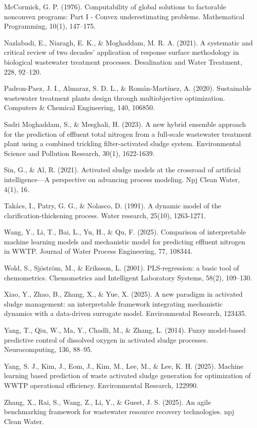\documentclass{article}
\begin{document}
McCormick, G. P. (1976). Computability of global solutions to factorable nonconvex programs: Part I - Convex underestimating problems. Mathematical Programming, 10(1), 147–175.

Nazlabadi, E., Niaragh, E. K., \& Moghaddam, M. R. A. (2021). A systematic and critical review of two decades’ application of response surface methodology in biological wastewater treatment processes. Desalination and Water Treatment, 228, 92–120.

Padron-Paez, J. I., Almaraz, S. D. L., \& Román-Martínez, A. (2020). Sustainable wastewater treatment plants design through multiobjective optimization. Computers \& Chemical Engineering, 140, 106850.

Sadri Moghaddam, S., \& Mesghali, H. (2023). A new hybrid ensemble approach for the prediction of effluent total nitrogen from a full-scale wastewater treatment plant using a combined trickling filter-activated sludge system. Environmental Science and Pollution Research, 30(1), 1622-1639.

Sin, G., \& Al, R. (2021). Activated sludge models at the crossroad of artificial intelligence—A perspective on advancing process modeling. Npj Clean Water, 4(1), 16.

Takács, I., Patry, G. G., \& Nolasco, D. (1991). A dynamic model of the clarification-thickening process. Water research, 25(10), 1263-1271.

Wang, Y., Li, T., Bai, L., Yu, H., \& Qu, F. (2025). Comparison of interpretable machine learning models and mechanistic model for predicting effluent nitrogen in WWTP. Journal of Water Process Engineering, 77, 108344.

Wold, S., Sjöström, M., \& Eriksson, L. (2001). PLS-regression: a basic tool of chemometrics. Chemometrics and Intelligent Laboratory Systems, 58(2), 109–130.

Xiao, Y., Zhao, B., Zhang, X., \& Yue, X. (2025). A new paradigm in activated sludge management: an interpretable framework integrating mechanistic dynamics with a data-driven surrogate model. Environmental Research, 123435.

Yang, T., Qiu, W., Ma, Y., Chadli, M., \& Zhang, L. (2014). Fuzzy model-based predictive control of dissolved oxygen in activated sludge processes. Neurocomputing, 136, 88–95.

Yang, S. J., Kim, J., Eom, J., Kim, M., Lee, M., \& Lee, K. H. (2025). Machine learning based prediction of waste activated sludge generation for optimization of WWTP operational efficiency. Environmental Research, 122990.

Zhang, X., Rai, S., Wang, Z., Li, Y., \& Guest, J. S. (2025). An agile benchmarking framework for wastewater resource recovery technologies. npj Clean Water.
\end{document}
